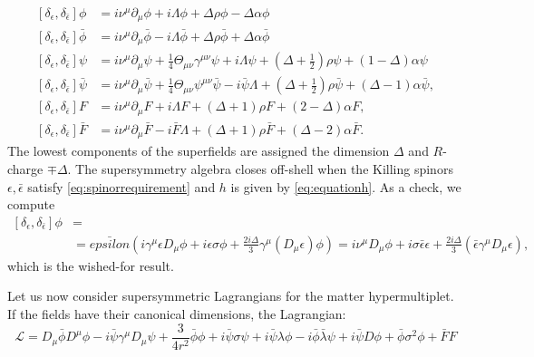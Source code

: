 \begin{align}
  \left[\delta_\epsilon,\delta_\bar{\epsilon}\right]\phi
  &= i\nu^\mu\partial_\mu\phi + i\Lambda\phi + \Delta\rho\phi
  - \Delta\alpha\phi\\
  \left[\delta_\epsilon,\delta_\bar{\epsilon}\right]\bar{\phi}
  &= i\nu^\mu\partial_\mu\bar{\phi} - i\Lambda\bar{\phi} + \Delta\rho\bar{\phi}
  +\Delta\alpha\bar{\phi}\\
  \left[\delta_\epsilon,\delta_\bar{\epsilon}\right]\psi
  &= i\nu^\mu\partial_\mu\psi+\frac{1}{4}\Theta_{\mu\nu}\gamma^{\mu\nu}\psi
  + i\Lambda\psi + \left(\Delta + \frac{1}{2}\right)\rho\psi
  + (1-\Delta)\alpha\psi\\
  \left[\delta_\epsilon,\delta_\bar{\epsilon}\right]\bar{\psi}
  &= i\nu^\mu\partial_\mu\bar{\psi}
  + \frac{1}{4}\Theta_{\mu\nu}\psi^{\mu\nu}\bar{\psi} - i\bar{\psi}\Lambda
  + \left(\Delta + \frac{1}{2}\right)\rho\bar{\psi} + \left(\Delta
  -1\right)\alpha\bar{\psi},\\
  \left[\delta_\epsilon,\delta_\bar{\epsilon}\right]F &= i\nu^\mu\partial_\mu F + i\Lambda F + \left(\Delta + 1\right)\rho F + \left(2-\Delta\right)\alpha F,\\
      \left[\delta_\epsilon,\delta_\bar{\epsilon}\right]\bar{F}
      &= i\nu^\mu\partial_\mu\bar{F} - i\bar{F}\Lambda + \left(\Delta
  + 1\right)\rho\bar{F} + \left(\Delta -2\right)\alpha\bar{F}.
\end{align}
The lowest components of the superfields are  assigned the dimension $\Delta$
and $R$-charge $\mp\Delta$. The supersymmetry algebra closes off-shell
when the Killing spinors $\epsilon,\bar{\epsilon}$ satisfy
\eqref{eq:spinorrequirement} and $h$ is given by \eqref{eq:equationh}.
As a check, we compute
\begin{align}
  \left[\delta_\epsilon,\delta_\bar{\epsilon}\right]\phi &=\\
                                                         &=\bar{epsilon}\left(i\gamma^\mu\epsilon
  D_\mu\phi + i\epsilon\sigma\phi
+ \frac{2i\Delta}{3}\gamma^\mu(D_\mu\epsilon)\phi\right) = i\nu^\mu D_\mu\phi
+ i\sigma\bar{\epsilon}\epsilon
+ \frac{2i\Delta}{3}\left(\bar{\epsilon}\gamma^\mu D_\mu\epsilon\right),
\end{align}
which is the wished-for result.
\par Let us now consider supersymmetric Lagrangians for the matter
hypermultiplet. If the fields have their canonical dimensions, the
Lagrangian:
\begin{equation}
  \mathcal{L} = D_\mu\bar{\phi} D^\mu \phi - i\bar{\psi}\gamma^\mu D_\mu \psi
  + \frac{3}{4r^2}\bar{\phi}\phi + i\bar{\psi}\sigma\psi
  + i\bar{\psi}\lambda\phi - i\bar{\phi}\bar{\lambda}\psi + i\bar{\psi} D\phi
  + \bar{\phi}\sigma^2\phi + \bar{F}F
  \label{eq:hyperlagrangian}
\end{equation}
